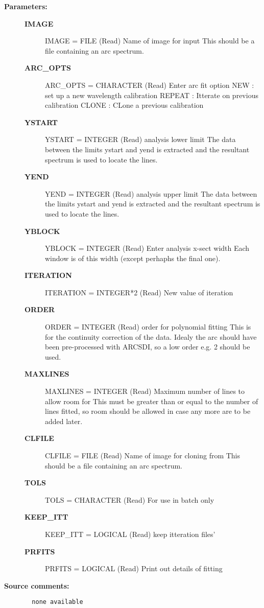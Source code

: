 \begin{description}
\item [{\bf Parameters:}]
\begin{description}
\item [{\bf IMAGE}]
IMAGE = FILE (Read)
        Name of image for input
          This should be a file containing an arc spectrum.
\item [{\bf ARC_OPTS}]
ARC_OPTS = CHARACTER (Read)
        Enter arc fit option
          NEW    : set up a new wavelength calibration
          REPEAT : Itterate on previous calibration
          CLONE  : CLone a previous calibration
\item [{\bf YSTART}]
YSTART = INTEGER (Read)
        analysis lower limit
            The data between the limits ystart and yend is extracted
            and the resultant spectrum is used to locate the lines.
\item [{\bf YEND}]
YEND = INTEGER (Read)
        analysis upper limit
            The data between the limits ystart and yend is extracted
            and the resultant spectrum is used to locate the lines.
\item [{\bf YBLOCK}]
    YBLOCK = INTEGER (Read)
        Enter analysis x-sect width
            Each window is of this width (except perhaphs the final one).
\item [{\bf ITERATION}]
    ITERATION = INTEGER*2 (Read)
        New value of iteration
\item [{\bf ORDER}]
    ORDER = INTEGER (Read)
        order for polynomial fitting
          This is for the continuity correction of the data. Idealy the
          arc should have been pre-processed with ARCSDI, so a low
          order e.g. 2 should be used.
\item [{\bf MAXLINES}]
    MAXLINES = INTEGER (Read)
        Maximum number of lines to allow room for
          This must be greater than or equal to the number of lines
          fitted, so room should be allowed in case any more are
          to be added later.
\item [{\bf CLFILE}]
    CLFILE = FILE (Read)
        Name of image for cloning from
          This should be a file containing an arc spectrum.
\item [{\bf TOLS}]
    TOLS = CHARACTER (Read)
        For use in batch only
\item [{\bf KEEP_ITT}]
    KEEP_ITT = LOGICAL (Read)
        keep itteration files'
\item [{\bf PRFITS}]
    PRFITS = LOGICAL (Read)
        Print out details of fitting
\end{description}

\item [{\bf Source comments:}]
\begin{verbatim}
  none available

\end{verbatim}
\end{description}
